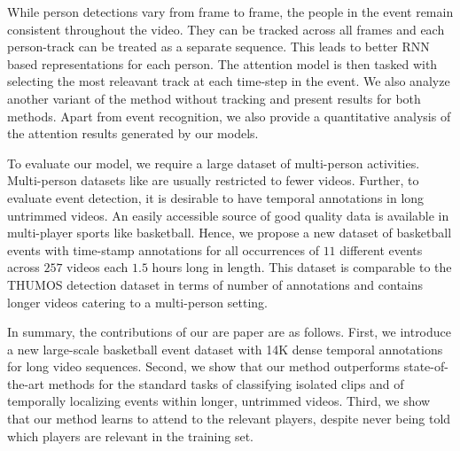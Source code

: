 While person detections vary from frame to frame, the people in the event remain
consistent throughout the video. They can be tracked across all frames and each
person-track can be treated as a separate sequence. This leads to better RNN
based representations for each person.  The attention model is then tasked with
selecting the most releavant track at each time-step in the event.  We also
analyze another variant of the method without tracking and present results for
both methods. Apart from event recognition, we also provide a quantitative
analysis of the attention results generated by our models.

To evaluate our model, we require a large dataset of multi-person activities.
Multi-person datasets like \cite{Ryoo_ICCV09,VIRAT,Choi_ICCV09} are usually restricted to fewer videos.
Further, to evaluate event detection, it is desirable to have temporal annotations in long
untrimmed videos. An easily accessible source of good quality data is
available in multi-player sports like basketball.
Hence, we propose a new dataset of basketball events with time-stamp annotations for
all occurrences of $11$ different events across $257$ videos each $1.5$ hours
long in length.  This dataset is comparable to the THUMOS \cite{THUMOS}
detection dataset in terms of number of annotations and contains longer videos
catering to a multi-person setting.

In summary, the contributions of our are paper are as follows.  First, we
introduce a new  large-scale basketball event dataset with 14K dense temporal
annotations for long video sequences.  Second, we show that our method
outperforms state-of-the-art methods for the standard tasks of classifying
isolated clips and of temporally localizing events within longer, untrimmed
videos.  Third, we show that our method learns to attend to the relevant
players, despite never being told which players are relevant in the training
set.
